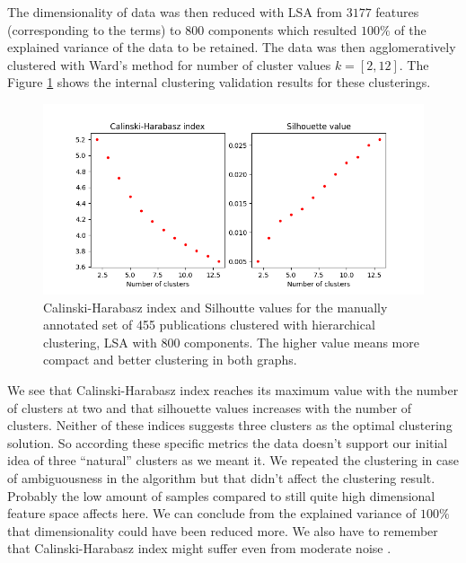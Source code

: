 The dimensionality of data was then reduced with LSA from $3177$
features (corresponding to the terms) to $800$ components which 
resulted $100\%$ of the explained variance of the data to be 
retained. The data was then agglomeratively clustered with Ward's 
method for number of cluster values $k=[2,12]$. 
The Figure \ref{fig:ch-silh01} shows the internal clustering 
validation results for these clusterings. 
\begin{figure}[ht]
  \begin{center}    
\includegraphics[width=11.5cm]{images/c-h-silh-index-plot-455-2_12-800-hierarchical.png}
    \caption{Calinski-Harabasz index and Silhoutte values for the
    manually annotated set of 455 publications clustered with 
    hierarchical clustering, LSA with 800 components. The higher 
    value means more compact and better clustering in both 
    graphs.}
    \label{fig:ch-silh01}
    \end{center}
\end{figure}
We see that Calinski-Harabasz index reaches its maximum value 
with the number of clusters at two and that silhouette values 
increases with the number of clusters.
Neither of these indices suggests three clusters as the optimal 
clustering solution. So according these specific metrics the data 
doesn't support our initial idea of three ``natural'' clusters as
we meant it. We repeated the clustering in case of ambiguousness
in the algorithm but that didn't affect the clustering result.
Probably the low amount of samples compared to 
still quite high dimensional feature space affects here. We can 
conclude from the explained variance of $100\%$ that dimensionality
could have been reduced more. We also 
have to remember that Calinski-Harabasz index might suffer even 
from moderate noise \cite{liu_understanding_2010}.

